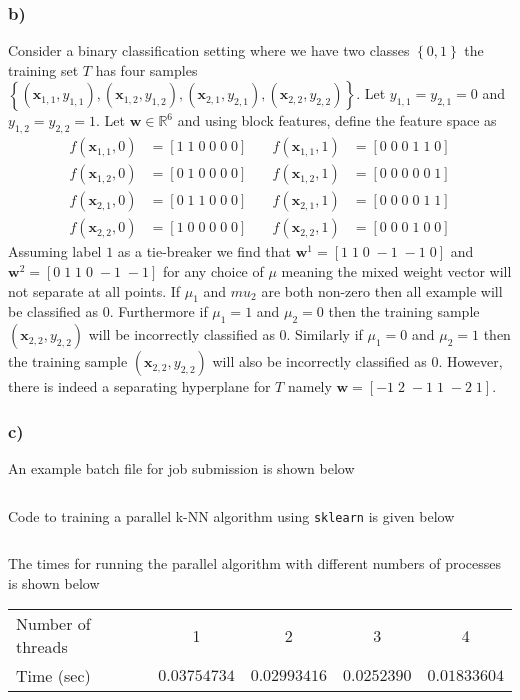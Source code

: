 \subsubsection*{{\bf b)}}
Consider a binary classification setting where we have two classes $\left\{ 0,1 \right\}$ the training set $T$ has four samples $\left\{ \left( \bm{x}_{1,1}, y_{1,1} \right), \left( \bm{x}_{1,2}, y_{1,2} \right), \left( \bm{x}_{2,1}, y_{2,1} \right), \left( \bm{x}_{2,2}, y_{2,2} \right) \right\}$. Let $y_{1,1} = y_{2,1} = 0$ and $y_{1,2} = y_{2,2} = 1$. Let $\bm{w} \in \mathbb{R}^{6}$ and using block features, define the feature space as
\begin{align*}
    f (\bm{x}_{1,1}, 0) &= \left[ 1 \; 1 \; 0 \; 0 \; 0 \; 0 \right] \quad & f (\bm{x}_{1,1}, 1) &= \left[ 0 \; 0 \; 0 \; 1 \; 1 \; 0 \right] \\
    f (\bm{x}_{1,2}, 0) &= \left[ 0 \; 1 \; 0 \; 0 \; 0 \; 0 \right] \quad & f (\bm{x}_{1,2}, 1) &= \left[ 0 \; 0 \; 0 \; 0 \; 0 \; 1 \right] \\
    f (\bm{x}_{2,1}, 0) &= \left[ 0 \; 1 \; 1 \; 0 \; 0 \; 0 \right] \quad & f (\bm{x}_{2,1}, 1) &= \left[ 0 \; 0 \; 0 \; 0 \; 1 \; 1 \right] \\
    f (\bm{x}_{2,2}, 0) &= \left[ 1 \; 0 \; 0 \; 0 \; 0 \; 0 \right] \quad & f (\bm{x}_{2,2}, 1) &= \left[ 0 \; 0 \; 0 \; 1 \; 0 \; 0 \right]
\end{align*}
Assuming label $1$ as a tie-breaker we find that $\bm{w}^{1} = \left[ 1 \; 1 \; 0 \; -1 \; -1 \; 0 \right]$ and $\bm{w}^{2} = \left[ 0 \; 1 \; 1 \; 0 \; -1 \; -1 \right]$ for any choice of $\mu$ meaning the mixed weight vector will not separate at all points. If $\mu_1$ and $mu_2$ are both non-zero then all example will be classified as $0$. Furthermore if $\mu_1 = 1$ and $\mu_2 = 0$ then the training sample $(\bm{x}_{2,2}, y_{2,2})$ will be incorrectly classified as $0$. Similarly if $\mu_1 = 0$ and $\mu_2 = 1$ then the training sample $(\bm{x}_{2,2}, y_{2,2})$ will also be incorrectly classified as $0$. However, there is indeed a separating hyperplane for $T$ namely $\bm{w} = \left[ -1 \; 2 \; -1 \; 1 \; -2 \; 1 \right]$.

\subsubsection*{{\bf c)}}
An example batch file for job submission is shown below
\inputminted[mathescape,
    linenos,
    numbersep=5pt,
    frame=lines,
    framesep=2mm]{bash}{src/batch/KNN_1_thread.sh}
    
Code to training a parallel k-NN algorithm using \texttt{sklearn} is given below
\inputminted[mathescape,
    linenos,
    numbersep=5pt,
    frame=lines,
    framesep=2mm]{python}{src/KNN_demo.py}
    
The times for running the parallel algorithm with different numbers of processes is shown below
\begin{table}[h!!!]
\begin{tabular}{l|c|c|c|c}
Number of threads & 1 & 2 & 3 & 4 \\ \cline{2-5} 
Time (sec)        & $0.03754734$ & $0.02993416$ & $0.0252390$ & $0.01833604$
\end{tabular}
\end{table}